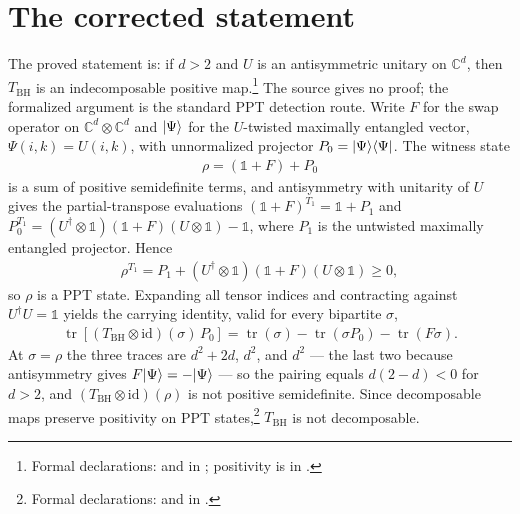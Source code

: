 \documentclass{article}
\begin{document}
\section{The corrected statement}

The proved statement is: if $d>2$ and $U$ is an antisymmetric unitary on
$\mathbb C^{d}$, then $T_{\mathrm{BH}}$ is an indecomposable positive
map.\footnote{Formal declarations:
 and
 in
; positivity is
 in
.}
The source gives no proof; the formalized argument is the standard PPT
detection route. Write $F$ for the swap operator on
$\mathbb C^{d}\otimes\mathbb C^{d}$ and $|\Psi\rangle$ for the $U$-twisted
maximally entangled vector, $\Psi(i,k)=U(i,k)$, with unnormalized projector
$P_{0}=|\Psi\rangle\langle \Psi|$. The witness state
\begin{align}
  \rho=(\mathbb 1+F)+P_{0}
\end{align}
is a sum of positive semidefinite terms, and antisymmetry with unitarity of
$U$ gives the partial-transpose evaluations
$(\mathbb 1+F)^{T_{1}}=\mathbb 1+P_{1}$ and
$P_{0}^{T_{1}}=(U^{\dagger}\otimes\mathbb 1)(\mathbb 1+F)(U\otimes\mathbb 1)
-\mathbb 1$, where $P_{1}$ is the untwisted maximally entangled projector.
Hence
\begin{align}
  \rho^{T_{1}}=P_{1}+(U^{\dagger}\otimes\mathbb 1)(\mathbb 1+F)(U\otimes\mathbb 1)
  \ge0,
\end{align}
so $\rho$ is a PPT state. Expanding all tensor indices and contracting
against $U^{\dagger}U=\mathbb 1$ yields the carrying identity, valid for
every bipartite $\sigma$,
\begin{align}
  \operatorname{tr}[(T_{\mathrm{BH}}\otimes\mathrm{id})(\sigma)\,P_{0}]
  =\operatorname{tr}(\sigma)-\operatorname{tr}(\sigma P_{0})
  -\operatorname{tr}(F\sigma).
\end{align}
At $\sigma=\rho$ the three traces are $d^{2}+2d$, $d^{2}$, and $d^{2}$ ---
the last two because antisymmetry gives $F|\Psi\rangle=-|\Psi\rangle$ --- so the
pairing equals $d(2-d)<0$ for $d>2$, and
$(T_{\mathrm{BH}}\otimes\mathrm{id})(\rho)$ is not positive semidefinite.
Since decomposable maps preserve positivity on PPT
states,\footnote{Formal declarations:
 and
in .}
$T_{\mathrm{BH}}$ is not decomposable.
\end{document}
